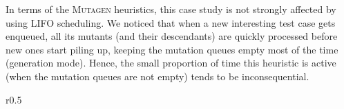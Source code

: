 \documentclass[sigconf,review,anonymous]{acmart}
\newcommand{\mutagen}{\textsc{Mutagen}\xspace}
\begin{document}
In terms of the \mutagen heuristics,
%
%
this case study is not strongly affected by using LIFO scheduling.
%
We noticed that when a new interesting test case gets enqueued, all its mutants
(and their descendants) are quickly processed before new ones start piling up,
keeping the mutation queues empty most of the time (generation mode).
%
Hence, the small proportion of time this heuristic is active (when the mutation
queues are not empty) tends to be inconsequential.

\setlength{\intextsep}{10pt}%
\setlength{\columnsep}{10pt}%
\begin{wrapfigure}{r}{0.5\linewidth}
\vspace{-5pt}
\scriptsize

\setlength{\tabcolsep}{2pt}
\renewcommand{\arraystretch}{1}


\end{wrapfigure}
\end{document}
